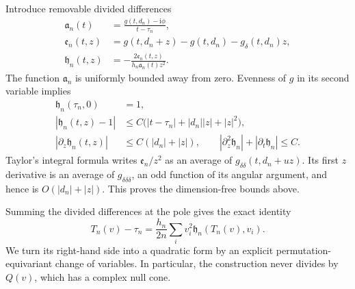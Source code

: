 \documentclass[11pt]{article}
\numberwithin{equation}{section}
\theoremstyle{definition}
\newcommand{\ii}{\mathrm i}
\begin{document}
Introduce removable divided differences
\begin{align}
 \mathfrak a_n(t)
   &=\frac{g(t,d_n)-\ii\phi}{t-\tau_n},\\
 \mathfrak e_n(t,z)
   &=g(t,d_n+z)-g(t,d_n)-g_\delta(t,d_n)z,\\
 \mathfrak h_n(t,z)
   &=-\frac{2\mathfrak e_n(t,z)}
             {h_n\mathfrak a_n(t)z^2}.
 \label{neg:divided-functions}
\end{align}
The function \(\mathfrak a_n\) is uniformly bounded away from zero.
Evenness of \(g\) in its second variable implies
\begin{align}
 \mathfrak h_n(\tau_n,0)&=1,\\
 |\mathfrak h_n(t,z)-1|
   &\le C\bigl(|t-\tau_n|+|d_n||z|+|z|^2\bigr),\\
 |\partial_z\mathfrak h_n(t,z)|
   &\le C(|d_n|+|z|),\qquad
 |\partial_z^2\mathfrak h_n|+|\partial_t\mathfrak h_n|\le C .
 \label{neg:divided-bounds}
\end{align}
Taylor's integral formula writes
\(\mathfrak e_n/z^2\) as an average of
\(g_{\delta\delta}(t,d_n+uz)\).  Its first \(z\) derivative
is an average of \(g_{\delta\delta\delta}\), an odd function
of its angular argument, and hence is \(O(|d_n|+|z|)\).
This proves the dimension-free bounds above.

Summing the divided differences at the pole gives the exact identity
\begin{equation}
 T_n(v)-\tau_n
   =\frac{h_n}{2n}
       \sum_i v_i^2\mathfrak h_n(T_n(v),v_i).
 \label{neg:separable-energy}
\end{equation}
We turn its right-hand side into a quadratic form by an explicit
permutation-equivariant change of variables.  In particular, the
construction never divides by \(Q(v)\), which has a complex null
cone.
\end{document}
